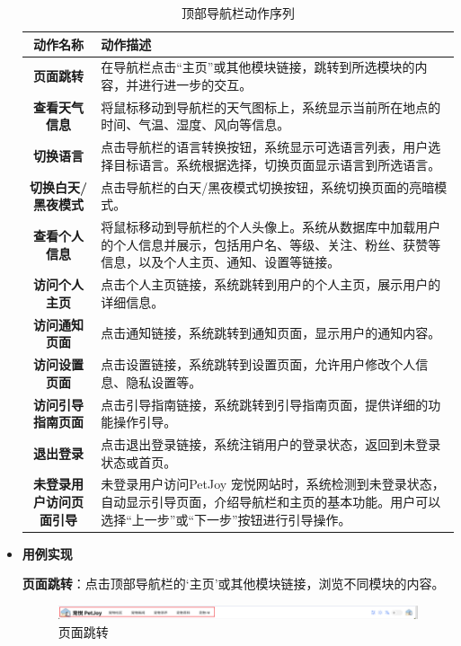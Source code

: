 \begin{itemize}
	\begin{table}[H]
		\centering
		\caption{顶部导航栏动作序列}
		\renewcommand\arraystretch{1.5}
		\begin{tabular}{|c|>{\raggedright\arraybackslash}p{10cm}|}
			\hline
			\textbf{动作名称} & \textbf{动作描述} \\ \hline
			\textbf{页面跳转} & 在导航栏点击“主页”或其他模块链接，跳转到所选模块的内容，并进行进一步的交互。 \\ \hline
			\textbf{查看天气信息} & 将鼠标移动到导航栏的天气图标上，系统显示当前所在地点的时间、气温、湿度、风向等信息。 \\ \hline
			\textbf{切换语言} & 点击导航栏的语言转换按钮，系统显示可选语言列表，用户选择目标语言。系统根据选择，切换页面显示语言到所选语言。 \\ \hline
			\textbf{切换白天/黑夜模式} & 点击导航栏的白天/黑夜模式切换按钮，系统切换页面的亮暗模式。 \\ \hline
			\textbf{查看个人信息} & 将鼠标移动到导航栏的个人头像上。系统从数据库中加载用户的个人信息并展示，包括用户名、等级、关注、粉丝、获赞等信息，以及个人主页、通知、设置等链接。 \\ \hline
			\textbf{访问个人主页} & 点击个人主页链接，系统跳转到用户的个人主页，展示用户的详细信息。 \\ \hline
			\textbf{访问通知页面} & 点击通知链接，系统跳转到通知页面，显示用户的通知内容。 \\ \hline
			\textbf{访问设置页面} & 点击设置链接，系统跳转到设置页面，允许用户修改个人信息、隐私设置等。 \\ \hline
			\textbf{访问引导指南页面} & 点击引导指南链接，系统跳转到引导指南页面，提供详细的功能操作引导。 \\ \hline
			\textbf{退出登录} & 点击退出登录链接，系统注销用户的登录状态，返回到未登录状态或首页。 \\ \hline
			\textbf{未登录用户访问页面引导} & 未登录用户访问PetJoy 宠悦网站时，系统检测到未登录状态，自动显示引导页面，介绍导航栏和主页的基本功能。用户可以选择“上一步”或“下一步”按钮进行引导操作。 \\ \hline
		\end{tabular}
	\end{table}

	\item \textbf{用例实现}

	\textbf{页面跳转}：点击顶部导航栏的‘主页’或其他模块链接，浏览不同模块的内容。

	\begin{figure}[H]
		\centering
		\includegraphics[scale=0.8]{figures/TopNavigationBar2.png} 
		\caption{页面跳转}
	\end{figure}


\end{itemize}
